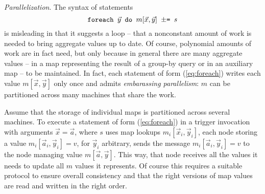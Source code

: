 {\em Parallelization}.
The syntax of statements
\begin{equation}
\mbox{{\tt foreach $\vec{y}$ do $m[\vec{x}, \vec{y}]$ $\pm$= $s$}}
\label{eq:foreach}
\end{equation}
is misleading in that it suggests a loop --
that a nonconstant amount of work is needed to bring aggregate
values up to date. Of course, polynomial amounts of work are in fact need,
but only because in general there are many aggregate values -- in a
map representing the result of a group-by query or in an auxiliary map --
to be maintained. In fact, each statement of form (\ref{eq:foreach})
writes each value $m[\vec{x}, \vec{y}]$ only once and admits
{\em embarassing parallelism}: $m$ can be partitioned across many machines
that share the work.

Assume that the storage of individual maps
is partitioned across several machines. To execute a statement of form
(\ref{eq:foreach})
in a trigger invocation with arguments $\vec{x} = \vec{a}$,
where $s$ uses map lookups $m_i[\vec{x}_i, \vec{y}_i]$,
each node storing a value $m_i[\vec{a}_i, \vec{y}_i] = v$,
for $\vec{y}_i$ arbitrary, sends the message
$m_i[\vec{a}_i, \vec{y}_i] = v$ to the node managing value
$m[\vec{a}, \vec{y}]$. This way, that node receives all the values it
needs to update all $m$ values it represents.
Of course this requires a suitable protocol to ensure overall consistency
and that the right versions of map values are read and written in the right
order.



